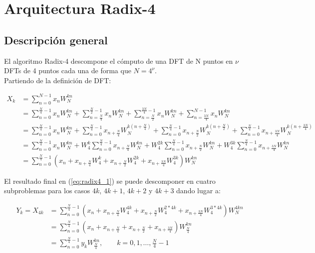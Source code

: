 \section{Arquitectura Radix-4}
\subsection{Descripción general}

El algoritmo Radix-4 descompone el cómputo de una DFT de N puntos en $\nu$ DFTs de 4 puntos cada
una de forma que $N = 4^\nu$.\\ Partiendo de la definición de DFT:

\begin{equation}
\begin{split}
 X_k &= \sum\limits_{n=0}^{N-1}x_n W_N^{kn} \\
 &= \sum\limits_{n=0}^{\frac{N}{4}-1}x_n W_N^{kn} + \sum\limits_{n=\frac{N}{4}}^{\frac{N}{2}-1}x_n
 W_N^{kn} + \sum\limits_{n=\frac{N}{2}}^{\frac{3N}{4}-1}x_n W_N^{kn} +
 \sum\limits_{n=\frac{3N}{4}}^{N-1}x_n W_N^{kn} \\
 &= \sum\limits_{n=0}^{\frac{N}{4}-1}x_n W_N^{kn} +
 \sum\limits_{n=0}^{\frac{N}{4}-1}x_{n+\frac{N}{4}} W_N^{k(n+\frac{N}{4})} +
 \sum\limits_{n=0}^{\frac{N}{4}-1}x_{n+\frac{N}{2}} W_N^{k(n+\frac{N}{2})} + 
 \sum\limits_{n=0}^{\frac{N}{4}-1}x_{n+\frac{3N}{4}} W_N^{k(n+\frac{3N}{4})} \\
 &= \sum\limits_{n=0}^{\frac{N}{4}-1}x_n W_N^{kn} +
 W_4^k \sum\limits_{n=0}^{\frac{N}{4}-1}x_{n+\frac{N}{4}} W_N^{kn} +
 W_4^{2k} \sum\limits_{n=0}^{\frac{N}{4}-1}x_{n+\frac{N}{2}} W_N^{kn} + 
 W_4^{3k}\sum\limits_{n=0}^{\frac{N}{4}-1}x_{n+\frac{3N}{4}} W_N^{kn} \\
 &= \sum\limits_{n=0}^{\frac{N}{4}-1}(x_n + x_{n+\frac{N}{4}} W_4^k + x_{n+\frac{N}{2}} W_4^{2k} + 
 x_{n+\frac{3N}{4}} W_4^{3k}) W_N^{kn}
\end{split}
\label{eq:radix4_1}
\end{equation}

El resultado final en (\ref{eq:radix4_1}) se puede descomponer en cuatro subproblemas para los casos
$4k$, $4k+1$, $4k+2$ y $4k+3$ dando lugar a:

\begin{equation}
\begin{split}
Y_k = X_{4k} &= \sum\limits_{n=0}^{\frac{N}{4}-1}(x_n + x_{n+\frac{N}{4}} W_4^{4k} +
x_{n+\frac{N}{2}} W_4^{2*4k} + x_{n+\frac{3N}{4}} W_4^{3*4k}) W_N^{4kn} \\
&= \sum\limits_{n=0}^{\frac{N}{4}-1}(x_n + x_{n+\frac{N}{4}} + x_{n+\frac{N}{2}} +
x_{n+\frac{3N}{4}}) W_{\frac{N}{4}}^{kn} \\
&= \sum\limits_{n=0}^{\frac{N}{4}-1} y_k W_{\frac{N}{4}}^{kn}, \qquad k = 0,1,\ldots,\frac{N}{4}-1
\end{split}
\label{eq:radix4_Y}
\end{equation}

